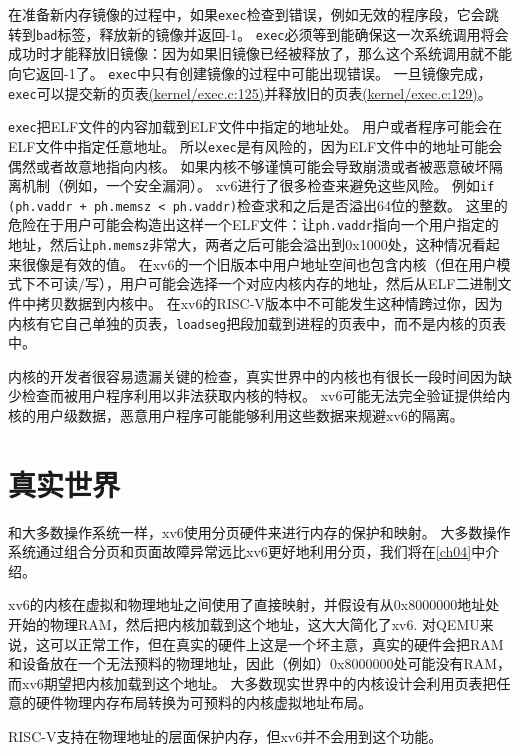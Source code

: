 在准备新内存镜像的过程中，如果\texttt{exec}检查到错误，例如无效的程序段，它会跳转到\texttt{bad}标签，释放新的镜像并返回-1。
\texttt{exec}必须等到能确保这一次系统调用将会成功时才能释放旧镜像：因为如果旧镜像已经被释放了，那么这个系统调用就不能向它返回-1了。
\texttt{exec}中只有创建镜像的过程中可能出现错误。
一旦镜像完成，\texttt{exec}可以提交新的页表\href{https://github.com/mit-pdos/xv6-riscv/blob/riscv/kernel/exec.c#L125}{(kernel/exec.c:125)}并释放旧的页表\href{https://github.com/mit-pdos/xv6-riscv/blob/riscv/kernel/exec.c#L129}{(kernel/exec.c:129)}。

\texttt{exec}把ELF文件的内容加载到ELF文件中指定的地址处。
用户或者程序可能会在ELF文件中指定任意地址。
所以\texttt{exec}是有风险的，因为ELF文件中的地址可能会偶然或者故意地指向内核。
如果内核不够谨慎可能会导致崩溃或者被恶意破坏隔离机制（例如，一个安全漏洞）。
xv6进行了很多检查来避免这些风险。
例如\texttt{if (ph.vaddr + ph.memsz < ph.vaddr)}检查求和之后是否溢出64位的整数。
这里的危险在于用户可能会构造出这样一个ELF文件：让\texttt{ph.vaddr}指向一个用户指定的地址，然后让\texttt{ph.memsz}非常大，两者之后可能会溢出到0x1000处，这种情况看起来很像是有效的值。
在xv6的一个旧版本中用户地址空间也包含内核（但在用户模式下不可读/写），用户可能会选择一个对应内核内存的地址，然后从ELF二进制文件中拷贝数据到内核中。
在xv6的RISC-V版本中不可能发生这种情跨过你，因为内核有它自己单独的页表，\texttt{loadseg}把段加载到进程的页表中，而不是内核的页表中。

内核的开发者很容易遗漏关键的检查，真实世界中的内核也有很长一段时间因为缺少检查而被用户程序利用以非法获取内核的特权。
xv6可能无法完全验证提供给内核的用户级数据，恶意用户程序可能能够利用这些数据来规避xv6的隔离。

\section{真实世界}
和大多数操作系统一样，xv6使用分页硬件来进行内存的保护和映射。
大多数操作系统通过组合分页和页面故障异常远比xv6更好地利用分页，我们将在\autoref{ch04}中介绍。

xv6的内核在虚拟和物理地址之间使用了直接映射，并假设有从0x8000000地址处开始的物理RAM，然后把内核加载到这个地址，这大大简化了xv6.
对QEMU来说，这可以正常工作，但在真实的硬件上这是一个坏主意，真实的硬件会把RAM和设备放在一个无法预料的物理地址，因此（例如）0x8000000处可能没有RAM，而xv6期望把内核加载到这个地址。
大多数现实世界中的内核设计会利用页表把任意的硬件物理内存布局转换为可预料的内核虚拟地址布局。

RISC-V支持在物理地址的层面保护内存，但xv6并不会用到这个功能。


